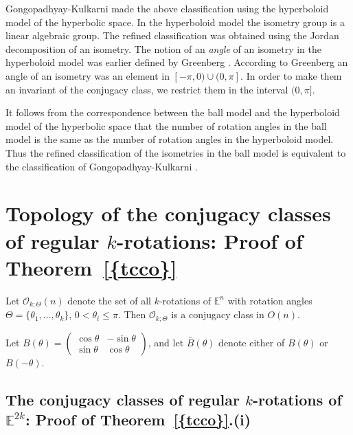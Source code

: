 \documentclass[11pt]{amsart}
\theoremstyle{definition}
\theoremstyle{remark}
\numberwithin{equation}{section}
\theoremstyle{plain}
\begin{document}
Gongopadhyay-Kulkarni \cite{kg} made  the above classification using the hyperboloid model of the hyperbolic space. In the hyperboloid model the isometry group is a linear algebraic group. The refined classification was obtained using the Jordan decomposition of an isometry. The notion of an \emph{angle} of an isometry in the hyperboloid model was earlier defined by Greenberg \cite{greenberg}. According to Greenberg an angle of an isometry was an  element in $[-\pi,0) \cup (0, \pi]$. In order to make them an invariant of the conjugacy class, we restrict them in the interval $(0, \pi]$. 

 It follows from the correspondence between the ball model and the hyperboloid model of the hyperbolic space that the number of rotation angles in the ball model is the same as the number of rotation angles in the hyperboloid model. Thus the refined classification of the isometries in the ball model is equivalent to the classification of Gongopadhyay-Kulkarni \cite{kg}. 
  

\section{Topology of the conjugacy classes of regular $k$-rotations: Proof of {Theorem~\ref{{tcco}}}}\label{cco}
Let ${\mathcal O}_{k;\Theta} (n)$ denote the set of all $k$-rotations of ${\mathbb E}^n$ with rotation angles $\Theta=\{\theta_1, ..., \theta_k\}$, $0 < \theta_i \leq \pi$. Then ${\mathcal O}_{k;\Theta}$ is a conjugacy class in $O(n)$. 

Let $B(\theta)=\begin{pmatrix} \cos \theta & - \sin \theta
\\ \sin \theta & \cos \theta \end{pmatrix}$, and let  $\bar B(\theta)$ denote either of $B(\theta)$ or $B(-\theta)$. 

\subsection{The conjugacy classes of regular $k$-rotations of ${\mathbb E}^{2k}$: Proof of {Theorem~\ref{{tcco}}}.(i)} \ \ 
\end{document}
